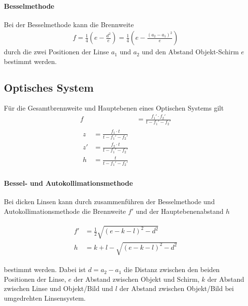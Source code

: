 \documentclass[11pt, a4paper]{article}
\begin{document}
    \paragraph{Besselmethode}
    Bei der Besselmethode kann die Brennweite
    \begin{align}
        f = \frac{1}{4} \left( e - \frac{d^2}{e} \right) = \frac{1}{4} \left( e - \frac{\left(a_2 - a_1\right)^2}{e} \right) \label{eq:bessel}
    \end{align}
    durch die zwei Positionen der Linse $a_1$ und $a_2$ und den Abstand Objekt-Schirm $e$ bestimmt werden.
    
    \subsection{Optisches System}

    Für die Gesamtbrennweite und Hauptebenen eines Optischen Systems gilt
    \begin{align}
        f &= \frac{f_1' \cdot f_2'}{t - f_1' - f_2'} \label{eq:brenn}\\ 
        \begin{split} \label{eq:ebene}
           z &= \frac{f_1 \cdot t}{t - f_1' - f_2'}  \\
           z' &= \frac{f_2 \cdot t}{t - f_1' - f_2'} \\
           h &= \frac{t}{t - f_1' - f_2'}
        \end{split}
    \end{align}


    \paragraph{Bessel- und Autokollimationsmethode}

    Bei dicken Linsen kann durch zusammenführen der Besselmethode und Autokollimationsmethode die Brennweite $f'$ und der Hauptebenenabstand $h$
    
    \begin{align} \begin{split} \label{eq:dicke}
        f' &= \frac{1}{2} \sqrt{(e-k-l)^2 - d^2} \\
        h &= k + l - \sqrt{(e-k-l)^2 - d^2} \end{split}
    \end{align}
        
    bestimmt werden. Dabei ist $d = a_2 - a_1$ die Distanz zwischen den beiden Positionen der Linse, $e$ der Abstand zwischen Objekt und Schirm, $k$ der Abstand zwischen Linse und Objekt/Bild und $l$ der Abstand zwischen Objekt/Bild bei umgedrehten Linsensystem.
\end{document}
